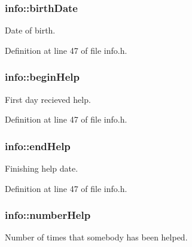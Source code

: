 \hypertarget{structinfo_a2269c62bc80419abee5ab99596715014}{
\subsubsection[{birth\+Date}]{\setlength{\rightskip}{0pt plus 5cm}info\+::birth\+Date}}\label{structinfo_a2269c62bc80419abee5ab99596715014}


Date of birth. 



Definition at line 47 of file info.\+h.

\hypertarget{structinfo_a860bf129937fda542024222bd425a224}{
\subsubsection[{begin\+Help}]{\setlength{\rightskip}{0pt plus 5cm}info\+::begin\+Help}}\label{structinfo_a860bf129937fda542024222bd425a224}


First day recieved help. 



Definition at line 47 of file info.\+h.

\hypertarget{structinfo_ac9af3f49f3357521492ffaf635897af4}{
\subsubsection[{end\+Help}]{\setlength{\rightskip}{0pt plus 5cm}info\+::end\+Help}}\label{structinfo_ac9af3f49f3357521492ffaf635897af4}


Finishing help date. 



Definition at line 47 of file info.\+h.

\hypertarget{structinfo_a96e373e7fbb00b84889fba5f87e23c6a}{
\subsubsection[{number\+Help}]{\setlength{\rightskip}{0pt plus 5cm}info\+::number\+Help}}\label{structinfo_a96e373e7fbb00b84889fba5f87e23c6a}


Number of times that somebody has been helped. 



